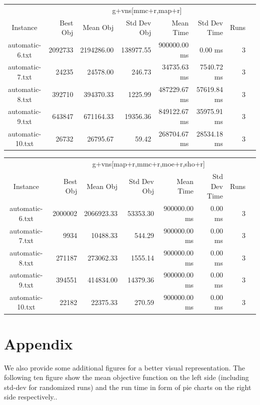 \documentclass[11pt]{article}
\begin{document}
{\begin{tabular}{c|rrrrrrr}
                 & \multicolumn{6}{c}{g+vns[mmc+r,map+r]}                   \\
Instance         & Best Obj & Mean Obj   & Std Dev Obj & Mean Time    & Std Dev Time & Runs \\
\hline
automatic-6.txt  & 2092733  & 2194286.00 & 138977.55   & 900000.00 ms & 0.00 ms      & 3 \\
automatic-7.txt  & 24235    & 24578.00   & 246.73      & 34735.63 ms  & 7540.72 ms   & 3 \\
automatic-8.txt  & 392710   & 394370.33  & 1225.99     & 487229.67 ms & 57619.84 ms  & 3 \\
automatic-9.txt  & 643847   & 671164.33  & 19356.36    & 849122.67 ms & 35975.91 ms  & 3 \\
automatic-10.txt & 26732    & 26795.67   & 59.42       & 268704.67 ms & 28534.18 ms  & 3 \\
\end{tabular}

\vspace{0.5cm}

\begin{tabular}{c|rrrrrrr}
                 & \multicolumn{6}{c}{g+vns[map+r,mmc+r,moe+r,sho+r]}                   \\
Instance         & Best Obj & Mean Obj   & Std Dev Obj & Mean Time    & Std Dev Time & Runs \\
\hline
automatic-6.txt  & 2000002  & 2066923.33 & 53353.30    & 900000.00 ms & 0.00 ms      & 3 \\
automatic-7.txt  & 9934     & 10488.33   & 544.29      & 900000.00 ms & 0.00 ms      & 3 \\
automatic-8.txt  & 271187   & 273062.33  & 1555.14     & 900000.00 ms & 0.00 ms      & 3 \\
automatic-9.txt  & 394551   & 414834.00  & 14379.36    & 900000.00 ms & 0.00 ms      & 3 \\
automatic-10.txt & 22182    & 22375.33   & 270.59      & 900000.00 ms & 0.00 ms      & 3 \\
\end{tabular}
}

\section{Appendix}
We also provide some additional figures for a better visual representation.
The following ten figure show the mean objective function on the left side (including std-dev for randomized runs) and the run time in form of pie charts on the right side respectively..
\end{document}
